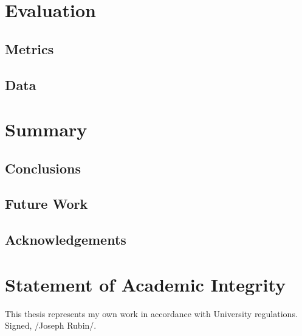 \documentclass{article}
\begin{document}
\section{Evaluation}
\subsection{Metrics}
\subsection{Data}
\section{Summary}
\subsection{Conclusions}
\subsection{Future Work}
\subsection{Acknowledgements}
\section*{Statement of Academic Integrity}
This thesis represents my own work in accordance with University regulations.\\
Signed, /Joseph Rubin/.

\cite{test}



\end{document}
